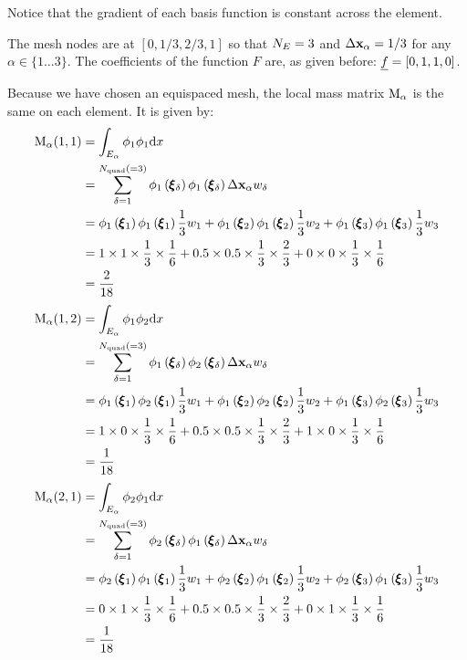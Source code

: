 \documentclass[a4paper, 11pt]{book}
\begin{document}
Notice that the gradient of each basis function is constant across the
element. 

The mesh nodes are at $[0, 1/3, 2/3, 1]$ so that $N_E=3$ and
$\Delta\mathbf{x}_\alpha=1/3$ for any $\alpha\in\{1\ldots3\}$. The coefficients of
the function $F$ are, as given before: $\underline{f}=[0, 1, 1, 0]$.

Because we have chosen an equispaced mesh, the local mass matrix $\mathrm{M}_\alpha$
is the same on each element. It is given by:
\begin{equation}
  \begin{split}
    \mathrm{M}_\alpha(1,1)&=\int_{E_\alpha} \phi_1\phi_1 \mathrm{d} x\\
    &=\sum_{\delta=1}^{N_\mathrm{quad}(=3)} 
    \phi_1\left(\pmb{\xi}_\delta\right)\phi_1\left(\pmb{\xi}_\delta\right)\Delta\mathbf{x}_\alpha w_\delta\\
    &=\phi_1\left(\pmb{\xi}_1\right)\phi_1\left(\pmb{\xi}_1\right)\frac{1}{3}w_1+
    \phi_1\left(\pmb{\xi}_2\right)\phi_1\left(\pmb{\xi}_2\right)\frac{1}{3}w_2+
    \phi_1\left(\pmb{\xi}_3\right)\phi_1\left(\pmb{\xi}_3\right)\frac{1}{3}w_3\\
    &=1\times1\times\frac{1}{3}\times\frac{1}{6}+0.5\times0.5\times\frac{1}{3}\times\frac{2}{3}+0\times0\times\frac{1}{3}\times\frac{1}{6}\\
    &=\frac{2}{18}
  \end{split}
\end{equation}
\begin{equation}
  \begin{split}
    \mathrm{M}_\alpha(1,2)&=\int_{E_\alpha} \phi_1\phi_2 \mathrm{d} x\\
    &=\sum_{\delta=1}^{N_\mathrm{quad}(=3)} 
    \phi_1\left(\pmb{\xi}_\delta\right)\phi_2\left(\pmb{\xi}_\delta\right)\Delta\mathbf{x}_\alpha w_\delta\\
    &=\phi_1\left(\pmb{\xi}_1\right)\phi_2\left(\pmb{\xi}_1\right)\frac{1}{3}w_1+
    \phi_1\left(\pmb{\xi}_2\right)\phi_2\left(\pmb{\xi}_2\right)\frac{1}{3}w_2+
    \phi_1\left(\pmb{\xi}_3\right)\phi_2\left(\pmb{\xi}_3\right)\frac{1}{3}w_3\\
    &=1\times0\times\frac{1}{3}\times\frac{1}{6}+0.5\times0.5\times\frac{1}{3}\times\frac{2}{3}+1\times0\times\frac{1}{3}\times\frac{1}{6}\\
    &=\frac{1}{18}    
  \end{split}
\end{equation}
\begin{equation}
  \begin{split}
    \mathrm{M}_\alpha(2,1)&=\int_{E_\alpha} \phi_2\phi_1 \mathrm{d} x\\
    &=\sum_{\delta=1}^{N_\mathrm{quad}(=3)} 
    \phi_2\left(\pmb{\xi}_\delta\right)\phi_1\left(\pmb{\xi}_\delta\right)\Delta\mathbf{x}_\alpha w_\delta\\
    &=\phi_2\left(\pmb{\xi}_1\right)\phi_1\left(\pmb{\xi}_1\right)\frac{1}{3}w_1+
    \phi_2\left(\pmb{\xi}_2\right)\phi_1\left(\pmb{\xi}_2\right)\frac{1}{3}w_2+
    \phi_2\left(\pmb{\xi}_3\right)\phi_1\left(\pmb{\xi}_3\right)\frac{1}{3}w_3\\
    &=0\times1\times\frac{1}{3}\times\frac{1}{6}+0.5\times0.5\times\frac{1}{3}\times\frac{2}{3}+0\times1\times\frac{1}{3}\times\frac{1}{6}\\
    &=\frac{1}{18}    
  \end{split}
\end{equation}
\end{document}
